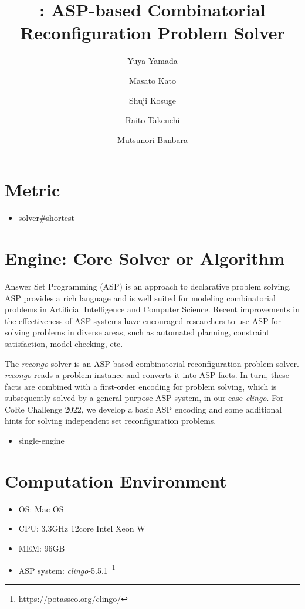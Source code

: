\documentclass[a4paper,dvipdfmx]{article}
\date{}
\title{{\recongo}: ASP-based Combinatorial Reconfiguration Problem Solver}
\author[1]{Yuya Yamada}
\author[2]{Masato Kato}
\author[2]{Shuji Kosuge}
\author[1]{Raito Takeuchi}
\author[1]{Mutsunori Banbara}
\affil[1]{Graduate School of Informatics, Nagoya University, Japan}
\affil[2]{School of Informatics, Nagoya University, Japan}
\newcommand{\clingo}{\textit{clingo}}
\newcommand{\recongo}{\textit{recongo}}
\begin{document}
\maketitle

\section{Metric}
\begin{itemize}
  \item solver{\#}shortest
\end{itemize}

\section{Engine: Core Solver or Algorithm}
Answer Set Programming (ASP) is an approach to declarative problem solving.
ASP provides a rich language and 
is well suited for modeling combinatorial problems 
in Artificial Intelligence and Computer Science.
Recent improvements in the effectiveness of ASP systems
have encouraged researchers to use ASP for solving problems in diverse
areas, such as
automated planning,
constraint satisfaction,
model checking, etc.

The {\recongo} solver is an ASP-based combinatorial reconfiguration
problem solver.
{\recongo} reads a problem instance and converts it into ASP facts.
In turn, these facts are combined with a first-order encoding for
problem solving, which is subsequently solved by a general-purpose ASP
system, in our case {\clingo}.
For CoRe Challenge 2022, we develop a basic ASP encoding and some
additional hints for solving independent set reconfiguration problems.

\begin{itemize}
\item single-engine
\end{itemize}

\section{Computation Environment}
\begin{itemize}
\item OS: Mac OS
\item CPU: 3.3GHz 12core Intel Xeon W
\item MEM: 96GB
\item ASP system: {\clingo}-5.5.1~\footnote{\url{https://potassco.org/clingo/}}
\end{itemize}
\end{document}
